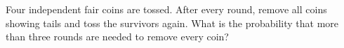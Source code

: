 Four independent fair coins are tossed. After every round, remove all coins showing tails and toss the survivors again. What is the probability that more than three rounds are needed to remove every coin?
